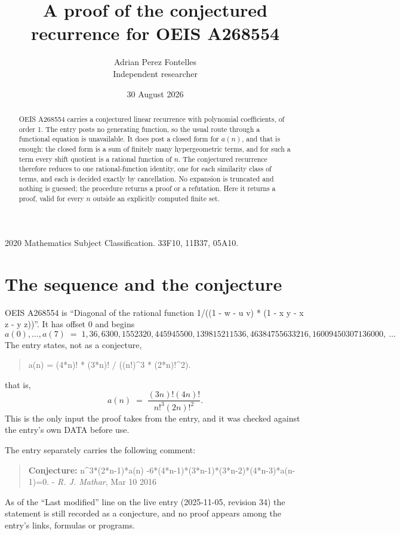 \documentclass[11pt,a4paper]{article}
\title{A proof of the conjectured recurrence for OEIS A268554}
\author{Adrian Perez Fontelles\\ \small Independent researcher}
\date{30 August 2026}
\theoremstyle{plain}
\theoremstyle{definition}
\begin{document}
\maketitle

\begin{abstract}
OEIS A268554 carries a conjectured linear recurrence with polynomial coefficients, of
order 1. The entry posts no generating function, so the usual route through a
functional equation is unavailable. It does post a closed form for $a(n)$, and that is
enough: the closed form is a sum of finitely many hypergeometric terms, and for such a
term every shift quotient is a rational function of $n$. The conjectured recurrence
therefore reduces to one rational-function identity, one for each similarity
class of terms, and each is decided exactly by cancellation. No expansion is truncated and
nothing is guessed; the procedure returns a proof or a refutation. Here it returns a proof,
valid for every $n$ outside an explicitly computed finite set.
\end{abstract}

\noindent\small 2020 Mathematics Subject Classification. 33F10, 11B37, 05A10.\normalsize

\section{The sequence and the conjecture}

OEIS A268554 is ``Diagonal of the rational function 1/((1 - w - u v) * (1 - x y - x z - y z))''. It has offset $0$ and begins
\[
a(0),\dots,a(7)\;=\;1, 36, 6300, 1552320, 445945500, 139815211536, 46384755633216, 16009450307136000,\ \dots
\]
The entry states, not as a conjecture,
\begin{quote}\small
a(n) = (4*n)! * (3*n)! / ((n!)\^{}3 * (2*n)!\^{}2).
\end{quote}
that is,
\begin{equation}\label{eq:cf}
a(n)\;=\;\frac{\left(3 n\right)! \left(4 n\right)!}{n!^{3} \left(2 n\right)!^{2}} .
\end{equation}
This is the only input the proof takes from the entry, and it was checked against the
entry's own DATA before use.

The entry separately carries the following comment:
\begin{quote}\small
\textbf{Conjecture:} n\^{}3*(2*n-1)*a(n) -6*(4*n-1)*(3*n-1)*(3*n-2)*(4*n-3)*a(n-1)=0. - \emph{R. J. Mathar}, Mar 10 2016
\end{quote}
As of the ``Last modified'' line on the live entry (2025-11-05, revision 34) the
statement is still recorded as a conjecture, and no proof appears among the entry's links,
formulas or programs.
\end{document}

